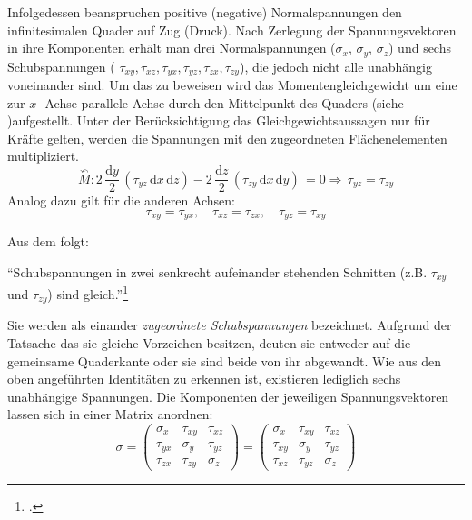 \documentclass[12pt,a4paper,parskip]{scrartcl}
\begin{document}
{Infolgedessen beanspruchen positive (negative) Normalspannungen den infinitesimalen Quader auf Zug (Druck). Nach Zerlegung der Spannungsvektoren in ihre Komponenten erhält man drei Normalspannungen ($ \sigma_x$, $ \sigma_y $, $ \sigma_z $) und sechs Schubspannungen ( $ \tau_{xy}, \tau_{xz}, \tau_{yx}, \tau_{yz}, \tau_{zx}, \tau_{zy} $), die jedoch nicht alle unabhängig voneinander sind. Um das zu beweisen wird das Momentengleichgewicht um eine zur $x$- Achse parallele Achse durch den Mittelpunkt des Quaders (siehe )aufgestellt. Unter der Berücksichtigung das Gleichgewichtsaussagen nur für Kräfte gelten, werden die Spannungen mit den zugeordneten Flächenelementen multipliziert.
\begin{equation}
\overset{\curvearrowleft}{M}: 2\,\frac{\text{d}y}{2}\,(\tau_{yz}\,\text{d}x\,\text{d}z) - 2\,\frac{\text{d}z}{2}\,(\tau_{zy}\, \text{d}x\,\text{d}y)\,= 0 \Rightarrow\,\tau_{yz} = \tau_{zy}
\end{equation} Analog dazu gilt für die anderen Achsen: \begin{equation}
\tau_{xy}=\tau_{yx},\quad\tau_{xz}=\tau_{zx},\quad\tau_{yz}=\tau_{xy}
\end{equation}

Aus dem folgt:

"`Schubspannungen in zwei senkrecht aufeinander stehenden Schnitten (z.B. $\tau_{xy}$ und $\tau_{zy}$) sind gleich."'\footcite[46]{tmr}

Sie werden als einander \emph{zugeordnete Schubspannungen} bezeichnet. Aufgrund der Tatsache das sie gleiche Vorzeichen besitzen, deuten sie entweder auf die gemeinsame Quaderkante oder sie sind beide von ihr abgewandt. Wie aus den oben angeführten Identitäten zu erkennen ist, existieren lediglich sechs unabhängige Spannungen. Die Komponenten der jeweiligen Spannungsvektoren lassen sich in einer Matrix anordnen:
\begin{equation}
\sigma = \begin{pmatrix}
\sigma_x & \tau_{xy} & \tau_{xz}\\
\tau_{yx} & \sigma_y & \tau_{yz}\\
\tau_{zx} & \tau_{zy} & \sigma_z
\end{pmatrix} = \begin{pmatrix}
\sigma_x & \tau_{xy} & \tau_{xz}\\
\tau_{xy} & \sigma_y & \tau_{yz}\\
\tau_{xz} & \tau_{yz} & \sigma_z
\end{pmatrix}
\end{equation}

}
\end{document}
